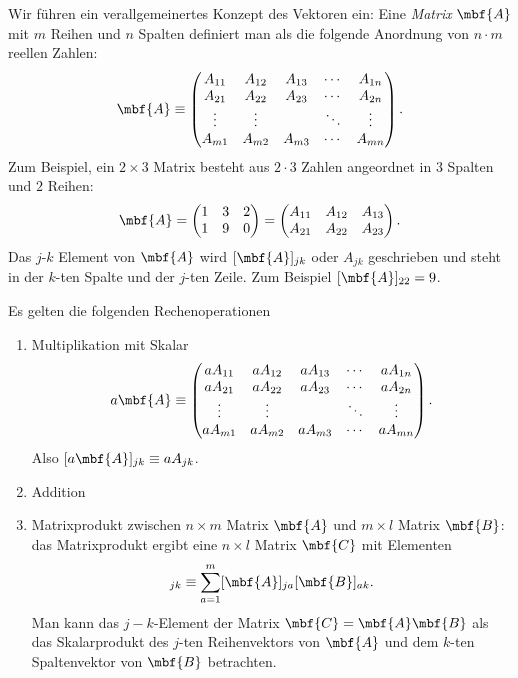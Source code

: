 Wir führen ein verallgemeinertes Konzept des Vektoren ein: Eine \emph{Matrix} $\mbf{A}$ mit $m$ Reihen und $n$ Spalten definiert man als die folgende Anordnung von $n\cdot m$ reellen Zahlen:
\begin{equation}
	\mbf{A} \equiv \begin{pmatrix}
		A_{11} & A_{12} & A_{13} & \cdots & A_{1n} \\
		A_{21} & A_{22} & A_{23} & \cdots & A_{2n} \\
		\vdots & \vdots & &  \ddots  & \vdots \\
		A_{m1} & A_{m2} & A_{m3} & \cdots & A_{mn} \\
	\end{pmatrix}.
\end{equation} 
Zum Beispiel, ein $2\times 3$ Matrix besteht aus $2\cdot 3$ Zahlen angeordnet in $3$ Spalten und $2$ Reihen:
\begin{equation}
	\mbf{A} = \begin{pmatrix}
		1 & 3 & 2 \\ 1 & 9 & 0
	\end{pmatrix} = \begin{pmatrix}
		A_{11} & A_{12} & A_{13} \\ A_{21} & A_{22} & A_{23}
	\end{pmatrix}. 
\end{equation}
Das $j$-$k$ Element von $\mbf{A}$ wird $[\mbf{A}]_{jk}$ oder $A_{jk}$ geschrieben und steht in der $k$-ten Spalte und der $j$-ten Zeile. Zum Beispiel $[\mbf{A}]_{22} = 9$.

Es gelten die folgenden Rechenoperationen
\begin{enumerate}
	\item Multiplikation mit Skalar
	\begin{equation}
	a\mbf{A} \equiv \begin{pmatrix}
		aA_{11} & aA_{12} & aA_{13} & \cdots & aA_{1n} \\
		aA_{21} & aA_{22} & aA_{23} & \cdots & aA_{2n} \\
		\vdots & \vdots & &  \ddots  & \vdots \\
		aA_{m1} & aA_{m2} & aA_{m3} & \cdots & aA_{mn} \\
	\end{pmatrix}.
	\end{equation} 
	Also $[a\mbf{A}]_{jk} \equiv aA_{jk}$.
	\item Addition
	\item Matrixprodukt zwischen $n\times m$ Matrix $\mbf{A}$ und $m\times l$ Matrix $\mbf{B}$: das Matrixprodukt ergibt eine $n\times l$ Matrix $\mbf{C}$ mit Elementen
	\begin{equation}
		[\mbf{C}]_{jk} \equiv \sum_{a = 1}^m [\mbf{A}]_{ja}[\mbf{B}]_{ak}.
	\end{equation}
	Man kann das $j-k$-Element der Matrix $\mbf{C} = \mbf{A}\mbf{B}$ als das Skalarprodukt des $j$-ten Reihenvektors von $\mbf{A}$ und dem $k$-ten Spaltenvektor von $\mbf{B}$ betrachten.
\end{enumerate}

